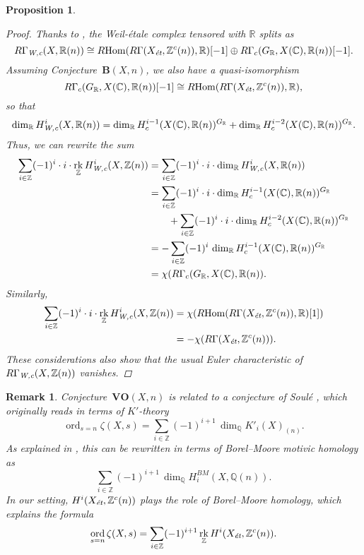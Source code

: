 \documentclass[10pt,a4paper,oneside]{article}
\DeclareMathOperator{\Hom}{Hom}
\DeclareMathOperator{\ord}{ord}
\DeclareMathOperator{\rk}{rk}
\newcommand{\CC}{\mathbb{C}}
\newcommand{\QQ}{\mathbb{Q}}
\newcommand{\RR}{\mathbb{R}}
\newcommand{\ZZ}{\mathbb{Z}}
\newcommand{\et}{\text{\it \'{e}t}}
\newcommand{\Wc}{\text{\it W,c}}
\newcommand{\RHom}{R\!\Hom}
\theoremstyle{myplain}
\newtheorem{proposition}[theorem]{Proposition}
\theoremstyle{mydefinition}
\newtheorem{remark}[theorem]{Remark}
\numberwithin{equation}{section}
\begin{document}
\begin{proposition}
  \begin{proof}
    Thanks to \cite[Proposition~7.13]{Beshenov-Weil-etale-1}, the Weil-\'{e}tale
    complex tensored with $\RR$ splits as
    \[ R\Gamma_\Wc (X,\RR (n)) \cong
      \RHom (R\Gamma (X_\et, \ZZ^c (n)), \RR) [-1] \oplus
      R\Gamma_c (G_\RR, X (\CC), \RR (n)) [-1]. \]
    Assuming Conjecture~$\mathbf{B} (X,n)$, we also have a quasi-isomorphism
    \[ R\Gamma_c (G_\RR, X (\CC), \RR (n)) [-1] \cong
      \RHom (R\Gamma (X_\et, \ZZ^c (n)), \RR), \]
    so that
    \[ \dim_\RR H^i_\Wc (X,\RR(n)) =
      \dim_\RR H^{i-1}_c (X (\CC), \RR (n))^{G_\RR} +
      \dim_\RR H^{i-2}_c (X (\CC), \RR (n))^{G_\RR}. \]
    Thus, we can rewrite the sum
    \begin{align*}
      \sum_{i \in \ZZ} (-1)^i \cdot i \cdot \rk_\ZZ H^i_\Wc (X, \ZZ (n)) & = \sum_{i \in \ZZ} (-1)^i \cdot i \cdot \dim_\RR H^i_\Wc (X, \RR (n)) \\
                                                                         & = \sum_{i \in \ZZ} (-1)^i \cdot i \cdot
                                                                           \dim_\RR H^{i-1}_c (X (\CC), \RR (n))^{G_\RR} \\
      & \quad\quad + \sum_{i \in \ZZ} (-1)^i \cdot i \cdot \dim_\RR H^{i-2}_c (X (\CC), \RR (n))^{G_\RR} \\
                                                                         & = -\sum_{i \in \ZZ} (-1)^i \, \dim_\RR H^{i-1}_c (X (\CC), \RR (n))^{G_\RR} \\
                                                                         & = \chi (R\Gamma_c (G_\RR, X (\CC), \RR (n)).
    \end{align*}
    Similarly,
    \begin{align*}
      \sum_{i \in \ZZ} (-1)^i \cdot i \cdot \rk_\ZZ H^i_\Wc (X, \ZZ (n)) & = \chi (\RHom (R\Gamma (X_\et, \ZZ^c (n)), \RR) [1]) \\
                                                                         & = -\chi (R\Gamma (X_\et, \ZZ^c (n))).
    \end{align*}
    These considerations also show that the usual Euler characteristic of
    $R\Gamma_\Wc (X, \ZZ(n))$ vanishes.
  \end{proof}
\end{proposition}

\begin{remark}
  Conjecture~$\mathbf{VO} (X,n)$ is related to a conjecture of Soul\'{e}
  \cite[Conjecture~2.2]{Soule-1984-ICM}, which originally reads in terms of
  $K'$-theory
  \[ \ord_{s=n} \zeta (X,s) =
    \sum_{i \in \ZZ} (-1)^{i+1} \, \dim_\QQ K'_i (X)_{(n)}. \]
  As explained in \cite[Remark~43]{Kahn-2005}, this can be rewritten in
  terms of Borel--Moore motivic homology as
  $$\sum_{i \in \ZZ} (-1)^{i+1} \, \dim_\QQ H_i^{BM} (X, \QQ (n)).$$
  In our setting, $H^i (X_\et, \ZZ^c (n))$ plays the role of Borel--Moore
  homology, which explains the formula
  \[ \ord_{s=n} \zeta (X,s) =
    \sum_{i \in \ZZ} (-1)^{i+1} \rk_\ZZ H^i (X_\et, \ZZ^c (n)). \]
\end{remark}
\end{document}
